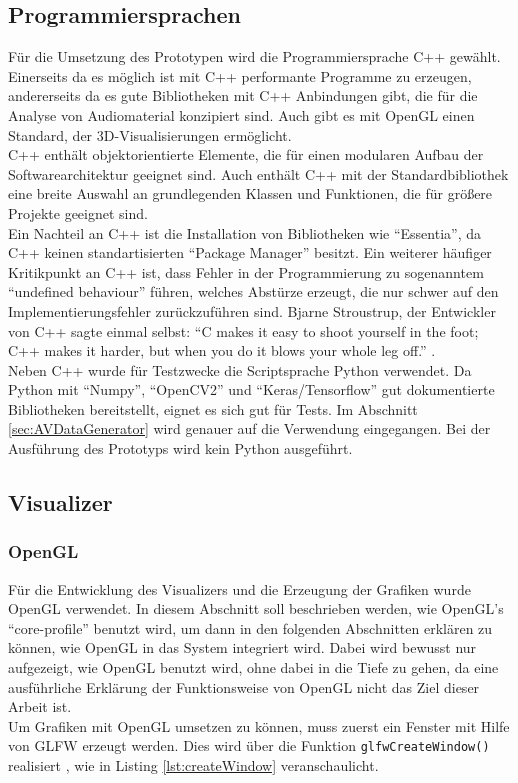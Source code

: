 \documentclass[11pt,a4paper]{article}
\begin{document}
\subsection{Programmiersprachen}
Für die Umsetzung des Prototypen wird die Programmiersprache C++ gewählt. Einerseits da es möglich ist mit C++ performante Programme zu erzeugen, andererseits da es gute Bibliotheken mit C++ Anbindungen gibt, die für die Analyse von Audiomaterial konzipiert sind. Auch gibt es mit OpenGL einen Standard, der 3D-Visualisierungen ermöglicht.\\
C++ enthält objektorientierte Elemente, die für einen modularen Aufbau der Softwarearchitektur geeignet sind. Auch enthält C++ mit der Standardbibliothek eine breite Auswahl an grundlegenden Klassen und Funktionen, die für größere Projekte geeignet sind.\\
Ein Nachteil an C++ ist die Installation von Bibliotheken wie ``Essentia'', da C++ keinen standartisierten ``Package Manager'' besitzt. Ein weiterer häufiger Kritikpunkt an C++ ist, dass Fehler in der Programmierung zu sogenanntem ``undefined behaviour'' führen, welches Abstürze erzeugt, die nur schwer auf den Implementierungsfehler zurückzuführen sind. Bjarne Stroustrup, der Entwickler von C++ sagte einmal selbst: ``C makes it easy to shoot yourself in the foot; C++ makes it harder, but when you do it blows your whole leg off.'' \cite{BjarneStroustrupCite}.\\
Neben C++ wurde für Testzwecke die Scriptsprache Python verwendet. Da Python mit ``Numpy'', ``OpenCV2'' und ``Keras/Tensorflow'' gut dokumentierte Bibliotheken bereitstellt, eignet es sich gut für Tests. Im Abschnitt \ref{sec:AVDataGenerator} wird genauer auf die Verwendung eingegangen. Bei der Ausführung des Prototyps wird kein Python ausgeführt.

\newpage
\subsection{Visualizer}
\subsubsection{OpenGL}
Für die Entwicklung des Visualizers und die Erzeugung der Grafiken wurde OpenGL verwendet. In diesem Abschnitt soll beschrieben werden, wie OpenGL's ``core-profile'' benutzt wird, um dann in den folgenden Abschnitten erklären zu können, wie OpenGL in das System integriert wird. Dabei wird bewusst nur aufgezeigt, wie OpenGL benutzt wird, ohne dabei in die Tiefe zu gehen, da eine ausführliche Erklärung der Funktionsweise von OpenGL nicht das Ziel dieser Arbeit ist.\\
Um Grafiken mit OpenGL umsetzen zu können, muss zuerst ein Fenster mit Hilfe von GLFW erzeugt werden. Dies wird über die Funktion \lstinline!glfwCreateWindow()! realisiert \cite[Hello-Window]{LearnOpenGL}, wie in Listing \ref{lst:createWindow} veranschaulicht.
\end{document}
